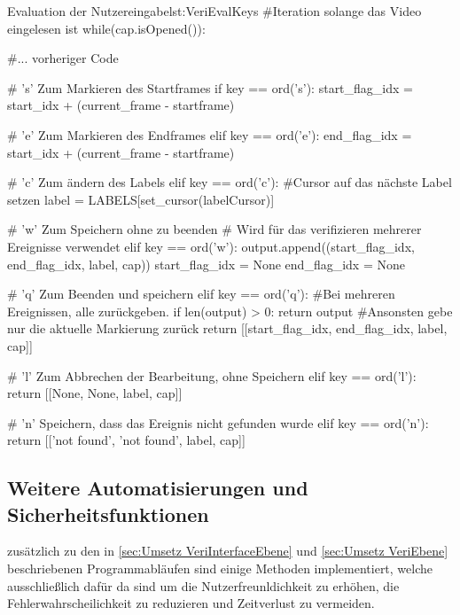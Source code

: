 \begin{pythoncode}{Evaluation der Nutzereingabe}{lst:VeriEvalKeys}
#Iteration solange das Video eingelesen ist
while(cap.isOpened()):

     #... vorheriger Code
     
    # 's' Zum Markieren des Startframes
    if key == ord('s'):
        start_flag_idx = start_idx + (current_frame - startframe)
    
    # 'e' Zum Markieren des Endframes
    elif key == ord('e'):
        end_flag_idx = start_idx + (current_frame - startframe)
    
    # 'c' Zum ändern des Labels
    elif key == ord('c'):
        #Cursor auf das nächste Label setzen
        label = LABELS[set_cursor(labelCursor)]

    # 'w' Zum Speichern ohne zu beenden
    # Wird für das verifizieren mehrerer Ereignisse verwendet
    elif key == ord('w'):
        output.append((start_flag_idx, end_flag_idx, label, cap))
        start_flag_idx = None
        end_flag_idx = None
    
    # 'q' Zum Beenden und speichern
    elif key == ord('q'):
        #Bei mehreren Ereignissen, alle zurückgeben.
        if len(output) > 0:
            return output
        #Ansonsten gebe nur die aktuelle Markierung zurück
        return [[start_flag_idx, end_flag_idx, label, cap]]
    
    # 'l' Zum Abbrechen der Bearbeitung, ohne Speichern
    elif key == ord('l'):
        return [[None, None, label, cap]]
    
    # 'n' Speichern, dass das Ereignis nicht gefunden wurde
    elif key == ord('n'):
        return [['not found', 'not found', label, cap]]

\end{pythoncode}



\subsection{Weitere Automatisierungen und Sicherheitsfunktionen} \label{sec:Umsetz VeriZusatz}
zusätzlich zu den in \ref{sec:Umsetz VeriInterfaceEbene} und \ref{sec:Umsetz VeriEbene} beschriebenen Programmabläufen sind einige Methoden implementiert, welche ausschließlich dafür da sind um die Nutzerfreunldichkeit zu erhöhen, die Fehlerwahrscheilichkeit zu reduzieren und Zeitverlust zu vermeiden. \par

